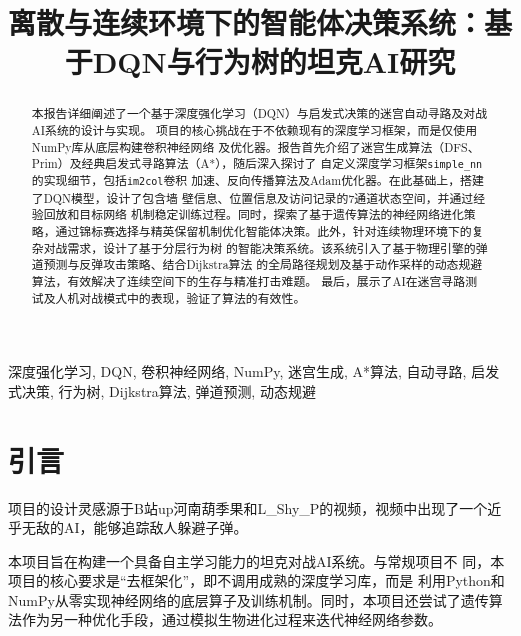 \documentclass[conference]{IEEEtran}
\title{离散与连续环境下的智能体决策系统：基于DQN与行为树的坦克AI研究}
\author{\IEEEauthorblockN{黄鹤翔\quad 高恒斌\quad 都奕宁} 
\IEEEauthorblockA{信息与电子工程学院\\
浙江大学, 杭州, 中国}
}
\begin{document}
\maketitle
\pagestyle{plain}
\begin{abstract}
本报告详细阐述了一个基于深度强化学习（DQN）与启发式决策的迷宫自动寻路及对战AI系统的设计与实现。
项目的核心挑战在于不依赖现有的深度学习框架，而是仅使用NumPy库从底层构建卷积神经网络
及优化器。报告首先介绍了迷宫生成算法（DFS、Prim）及经典启发式寻路算法（A*），随后深入探讨了
自定义深度学习框架\texttt{simple\_nn}的实现细节，包括\texttt{im2col}卷积
加速、反向传播算法及Adam优化器。在此基础上，搭建了DQN模型，设计了包含墙
壁信息、位置信息及访问记录的7通道状态空间，并通过经验回放和目标网络
机制稳定训练过程。同时，探索了基于遗传算法的神经网络进化策略，通过锦标赛选择与精英保留机制优化智能体决策。此外，针对连续物理环境下的复杂对战需求，设计了基于分层行为树
的智能决策系统。该系统引入了基于物理引擎的弹道预测与反弹攻击策略、结合Dijkstra算法
的全局路径规划及基于动作采样的动态规避算法，有效解决了连续空间下的生存与精准打击难题。
最后，展示了AI在迷宫寻路测试及人机对战模式中的表现，验证了算法的有效性。
\end{abstract}

\begin{IEEEkeywords}
深度强化学习, DQN, 卷积神经网络, NumPy, 迷宫生成, A*算法, 自动寻路, 启发式决策, 行为树, Dijkstra算法, 弹道预测, 动态规避
\end{IEEEkeywords}


\section{引言}
项目的设计灵感源于B站up\@ 河南葫季果和\@ L\_Shy\_P的视频，视频中出现了一个近
乎无敌的AI，能够追踪敌人躲避子弹。

本项目旨在构建一个具备自主学习能力的坦克对战AI系统。与常规项目不
同，本项目的核心要求是“去框架化”，即不调用成熟的深度学习库，而是
利用Python和NumPy从零实现神经网络的底层算子及训练机制。同时，本项目还尝试了遗传算法作为另一种优化手段，通过模拟生物进化过程来迭代神经网络参数。
\end{document}
